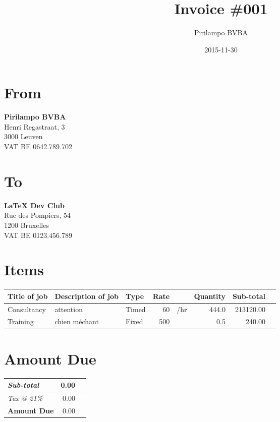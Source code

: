 \documentclass[a4paper]{article}
\author{Pirilampo BVBA}
\date{2015-11-30}
\title{Invoice \#001}
\begin{document}
\maketitle

\section*{From}
\label{sec:orgheadline1}

\textbf{Pirilampo BVBA} \\
Henri Regastraat, 3 \\
3000 Leuven \\
VAT BE 0642.789.702

\section*{To}
\label{sec:orgheadline2}

\textbf{\LaTeX{} Dev Club} \\
Rue des Pompiers, 54 \\
1200 Bruxelles \\
VAT BE 0123.456.789

\vspace*{5ex}{\color{prlp-gray2}\hrule}

\section*{Items}
\label{sec:orgheadline3}

\begin{center}
\label{tab:orgtable1}

\begin{tabu}{lXlrlrrl}
Title of job & Description of job & Type & Rate &  & Quantity & Sub-total & \\
\hline
Consultancy & attention & Timed & 60 & \texteuro{}/hr & 444.0 & 213120.00 & \texteuro{}\\
Training & chien méchant & Fixed & 500 & \texteuro{} & 0.5 & 240.00 & \texteuro{}\\
\end{tabu}
\end{center}

\section*{Amount Due}
\label{sec:orgheadline4}

\hfill\colorbox{prlp-light-gray}{\begin{minipage}{7.5cm}

\begin{center}
\begin{tabu}{Xrl}
\emph{Sub-total} & 0.00 & \texteuro{}\\
\hline
\emph{Tax @ 21\%} & 0.00 & \texteuro{}\\
\hline
\textbf{Amount Due} & 0.00 & \textbf{\texteuro{}}\\
\end{tabu}
\end{center}

\end{minipage}}
\end{document}
